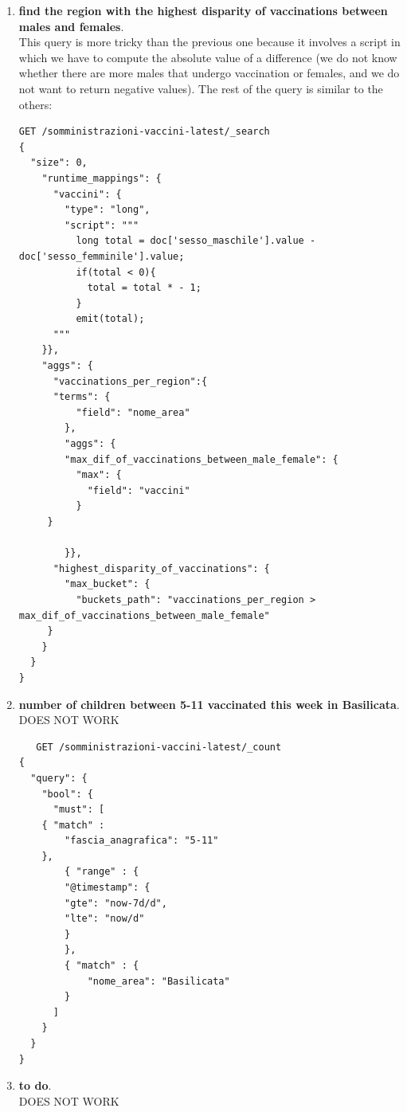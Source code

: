 \documentclass{article}
\begin{document}
\begin{enumerate}
\begin{lstlisting}
      }
     }
    }
  ]
    }},
  "aggs": {
    "vaccine_doses_received": {
      "sum": {
        "field": "numero_dosi"
      }
    }
  }
}
\end{lstlisting}
\item \textbf{find the region with the highest disparity of vaccinations between males and females}.\\
This query is more tricky than the previous one because it involves a script in which we have to compute the absolute value of a difference (we do not know whether there are more males that undergo vaccination or females, and we do not want to return negative values). The rest of the query is similar to the others:
\begin{lstlisting}
GET /somministrazioni-vaccini-latest/_search
{
  "size": 0,
    "runtime_mappings": {
      "vaccini": {
        "type": "long",
        "script": """
          long total = doc['sesso_maschile'].value - doc['sesso_femminile'].value;
          if(total < 0){
            total = total * - 1;
          }
          emit(total);
      """
    }},
    "aggs": {
      "vaccinations_per_region":{
      "terms": {
          "field": "nome_area"
        },
        "aggs": {
        "max_dif_of_vaccinations_between_male_female": {
          "max": {
            "field": "vaccini"
          }
     }
          
        }},
      "highest_disparity_of_vaccinations": {
        "max_bucket": {
          "buckets_path": "vaccinations_per_region > max_dif_of_vaccinations_between_male_female" 
     }
    }
  }
}
\end{lstlisting}
\item \textbf{number of children between 5-11 vaccinated this week in Basilicata}.\\
DOES NOT WORK
\begin{lstlisting}
   GET /somministrazioni-vaccini-latest/_count
{
  "query": {
    "bool": {
      "must": [
	{ "match" : 
	    "fascia_anagrafica": "5-11" 
	},
        { "range" : {
	    "@timestamp": {
		"gte": "now-7d/d",
		"lte": "now/d"
	    }
        },
        { "match" : {
            "nome_area": "Basilicata"
        }
      ]
    }
  }
}
\end{lstlisting}
\item \textbf{to do}.\\
DOES NOT WORK
\begin{lstlisting}
   

\end{lstlisting}
\end{enumerate}
\end{document}
